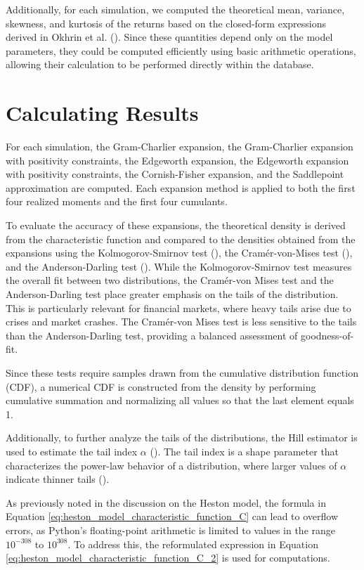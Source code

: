 Additionally, for each simulation, we computed the theoretical mean, variance, skewness, and kurtosis of the returns based on the closed-form expressions derived in Okhrin et al. (\citeyear{okhrinDistributionalPropertiesContinuous2023}). Since these quantities depend only on the model parameters, they could be computed efficiently using basic arithmetic operations, allowing their calculation to be performed directly within the database.

\section{Calculating Results}
For each simulation, the Gram-Charlier expansion, the Gram-Charlier expansion with positivity constraints, the Edgeworth expansion, the Edgeworth expansion with positivity constraints, the Cornish-Fisher expansion, and the Saddlepoint approximation are computed. Each expansion method is applied to both the first four realized moments and the first four cumulants.

To evaluate the accuracy of these expansions, the theoretical density is derived from the characteristic function and compared to the densities obtained from the expansions using the Kolmogorov-Smirnov test (\cite{kolmogorovSullaDeterminazioneEmpirica1993}), the Cramér-von-Mises test (\cite{vonmisesWahrscheinlichkeitStatistikUnd1928, cramerCompositionElementaryErrors1928, andersonDistributionTwoSampleCramervon1962}), and the Anderson-Darling test (\cite{andersonTestGoodnessFit1954}). While the Kolmogorov-Smirnov test measures the overall fit between two distributions, the Cramér-von Mises test and the Anderson-Darling test place greater emphasis on the tails of the distribution. This is particularly relevant for financial markets, where heavy tails arise due to crises and market crashes. The Cramér-von Mises test is less sensitive to the tails than the Anderson-Darling test, providing a balanced assessment of goodness-of-fit.

Since these tests require samples drawn from the cumulative distribution function (CDF), a numerical CDF is constructed from the density by performing cumulative summation and normalizing all values so that the last element equals 1.

Additionally, to further analyze the tails of the distributions, the Hill estimator is used to estimate the tail index $\alpha$ (\cite{hillSimpleGeneralApproach1975}). The tail index is a shape parameter that characterizes the power-law behavior of a distribution, where larger values of $\alpha$ indicate thinner tails (\cite{fischlerAnswerDefinitionTailindex2017, danielssonTailIndexEstimation2016}).

As previously noted in the discussion on the Heston model, the formula in Equation \eqref{eq:heston_model_characteristic_function_C} can lead to overflow errors, as Python's floating-point arithmetic is limited to values in the range $10^{-308}$ to $10^{308}$. To address this, the reformulated expression in Equation \eqref{eq:heston_model_characteristic_function_C_2} is used for computations.